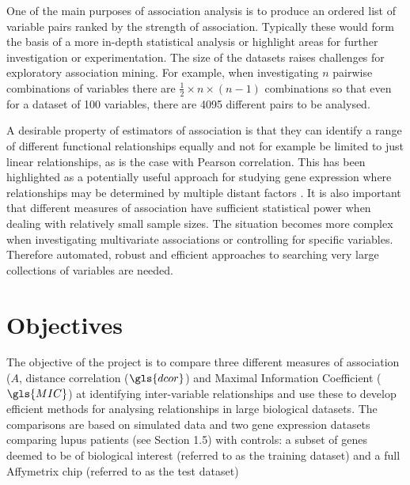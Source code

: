 \documentclass[a4paper, 12pt]{report}
\begin{document}

One of the main purposes of association analysis is to produce an ordered list of variable pairs ranked by the strength of association. Typically these would form the basis of a more in-depth statistical analysis or highlight areas for further investigation or experimentation. The size of the datasets raises challenges for exploratory association mining. For example, when investigating $n$ pairwise combinations of variables there are $\frac{1}{2} \times n \times (n-1)$ combinations so that even for a dataset of 100 variables, there are 4095 different pairs to be analysed. 

A desirable property of estimators of association is that they can identify a range of different functional relationships equally and not for example be limited to just linear relationships, as is the case with Pearson correlation. %
This has been highlighted as a potentially useful approach for studying gene expression where relationships may be determined by multiple distant factors  \cite{bigdata2012}. It is also important that different measures of association have sufficient statistical power when dealing with relatively small sample sizes. The situation becomes more complex when investigating multivariate associations or controlling for specific variables. Therefore automated, robust and efficient approaches to searching very large collections of variables are needed.

\section{Objectives}
The objective of the project is to compare three different measures of association ($A$, distance correlation ($\gls{dcor}$) and Maximal Information Coefficient ($\gls{MIC}$) at identifying inter-variable relationships and use these to develop efficient methods for analysing relationships in large biological datasets. The comparisons are based on simulated data and two gene expression datasets comparing lupus patients (see Section 1.5) with controls: a subset of genes deemed to be of biological interest (referred to as the training dataset) and a full Affymetrix chip (referred to as the test dataset)
\end{document}

